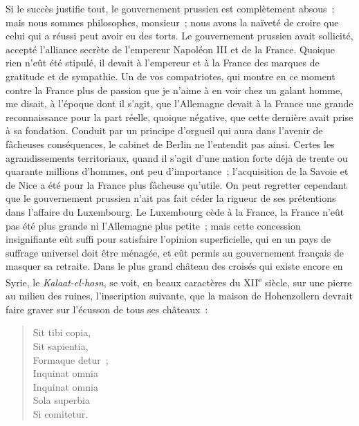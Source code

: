 \documentclass[french,twoside]{book} %
\begin{document}
Si le succès justifie tout, le gouvernement prussien est complètement absous ; mais nous sommes philosophes, monsieur ; nous avons la naïveté de croire que celui qui a réussi peut avoir eu des torts. Le gouvernement prussien avait sollicité, accepté l’alliance secrète de l’empereur Napoléon III et de la France. Quoique rien n’eût été stipulé, il devait à l’empereur et à la France des marques de gratitude et de sympathie. Un de vos compatriotes, qui montre en ce moment contre la France plus de passion que je n’aime à en voir chez un galant homme, me disait, à l’époque dont il s’agit, que l’Allemagne devait à la France une grande reconnaissance pour la part réelle, quoique négative, que cette dernière avait prise à sa fondation. Conduit par un principe d’orgueil qui aura dans l’avenir de fâcheuses conséquences, le cabinet de Berlin ne l’entendit pas ainsi. Certes les agrandissements territoriaux, quand il s’agit d’une nation forte déjà de trente ou quarante millions d’hommes, ont peu d’importance ; l’acquisition de la Savoie et de Nice a été pour la France plus fâcheuse qu’utile. On peut regretter cependant que le gouvernement prussien n’ait pas fait céder la rigueur de ses prétentions dans l’affaire du Luxembourg. Le Luxembourg cède à la France, la France n’eût pas été plus grande ni l’Allemagne plus petite ; mais cette concession insignifiante eût suffi pour satisfaire l’opinion superficielle, qui en un pays de suffrage universel doit être ménagée, et eût permis au gouvernement français de masquer sa retraite. Dans le plus grand château des croisés qui existe encore en Syrie, le {\itshape Kalaat-el-hosn}, se voit, en beaux caractères du XII\textsuperscript{e} siècle, sur une pierre au milieu des ruines, l’inscription suivante, que la maison de Hohenzollern devrait faire graver sur l’écusson de tous ses châteaux :\par


\begin{verse}
Sit tibi copia,\\
Sit sapientia,\\
Formaque detur ;\\
Inquinat omnia\\
Inquinat omnia\\
Sola superbia\\
Si comitetur.\\
\end{verse}
\end{document}
